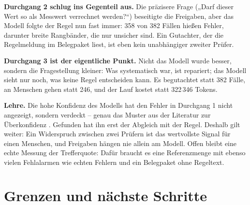 \documentclass[11pt,a4paper]{article}
\newcommand{\befund}[1]{%
  \par\vspace{2pt}\noindent\colorbox{softgrey}{%
  \begin{minipage}{\dimexpr\linewidth-2\fboxsep}\small\vspace{3pt}#1\vspace{3pt}\end{minipage}}\par\vspace{4pt}}
\begin{document}
\textbf{Durchgang 2 schlug ins Gegenteil aus.} Die präzisere Frage („Darf dieser Wert so als Messwert verrechnet werden?“) beseitigte die Freigaben, aber das Modell folgte der Regel nun fast immer: 358 von 382 Fällen hießen Fehler, darunter breite Rangbänder, die nur unsicher sind. Ein Gutachter, der die Regelmeldung im Belegpaket liest, ist eben kein unabhängiger zweiter Prüfer.

\textbf{Durchgang 3 ist der eigentliche Punkt.} Nicht das Modell wurde besser, sondern die Fragestellung kleiner: Was systematisch war, ist repariert; das Modell sieht nur noch, was keine Regel entscheiden kann. Es begutachtet \statFlags{} statt 382 Fälle, an Menschen gehen \kiMensch{} statt 246, und der Lauf kostet \kiTokens{} statt 322\,346 Tokens.

\befund{\textbf{Lehre.} Die hohe Konfidenz des Modells hat den Fehler in Durchgang 1 nicht angezeigt, sondern verdeckt -- genau das Muster aus der Literatur zur Überkonfidenz \cite{overconf}. Gefunden hat ihn erst der Abgleich mit der Regel. Deshalb gilt weiter: Ein Widerspruch zwischen zwei Prüfern ist das wertvollste Signal für einen Menschen, und Freigaben hängen nie allein am Modell. Offen bleibt eine echte Messung der Trefferquote: Dafür braucht es eine Referenzmenge mit ebenso vielen Fehlalarmen wie echten Fehlern und ein Belegpaket ohne Regeltext.}

\section{Grenzen und nächste Schritte}
\end{document}
